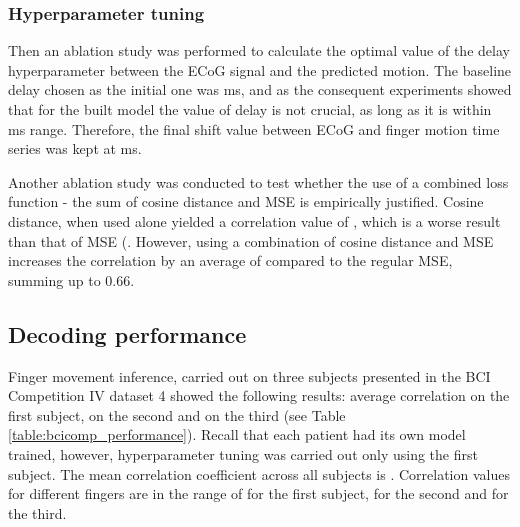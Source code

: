 \documentclass[letterpaper]{article} \usepackage{aaai22}  \usepackage{times}  \usepackage{helvet}  \usepackage{courier}  \usepackage[hyphens]{url}  \usepackage{graphicx} \urlstyle{rm} \def\UrlFont{\rm}  \usepackage{natbib}  \usepackage{caption} \DeclareCaptionStyle{ruled}{labelfont=normalfont,labelsep=colon,strut=off} \frenchspacing  \setlength{\pdfpagewidth}{8.5in}  \setlength{\pdfpageheight}{11in}  \usepackage{algorithm}
\begin{document}
\subsubsection{Hyperparameter tuning}
Then an ablation study was performed to calculate the optimal value of the delay hyperparameter between the ECoG signal and the predicted motion. The baseline delay chosen as the initial one was  ms, and as the consequent experiments showed that for the built model the value of delay is not crucial, as long as it is within ms range. Therefore, the final shift value between ECoG and finger motion time series was kept at  ms. 

Another ablation study was conducted to test whether the use of a combined loss function - the sum of cosine distance and MSE is empirically justified. Cosine distance, when used alone yielded a correlation value of , which is a worse result than that of MSE (. However, using a combination of cosine distance and MSE increases the correlation by an average of  compared to the regular MSE, summing up to 0.66. 

\subsection{Decoding performance}

Finger movement inference, carried out on three subjects presented in the BCI Competition IV dataset 4 showed the following results:  average correlation on the first subject,  on the second and  on the third (see Table \ref{table:bcicomp_performance}). Recall that each patient had its own model trained, however, hyperparameter tuning was carried out only using the first subject. The mean correlation coefficient across all subjects is . Correlation values for different fingers are in the range of  for the first subject,  for the second and  for the third.
\end{document}
